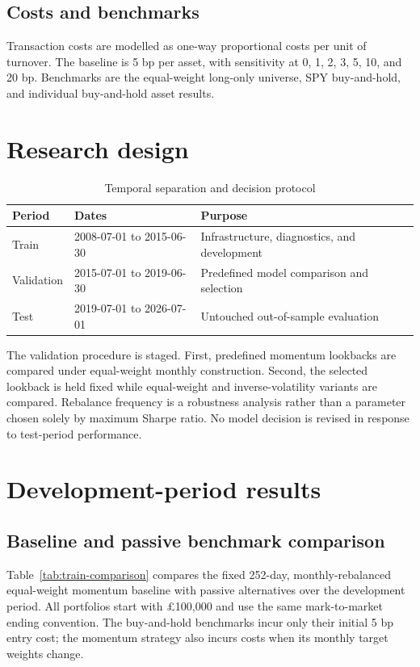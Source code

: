 \documentclass[11pt,a4paper]{article}
\begin{document}
\subsection{Costs and benchmarks}
Transaction costs are modelled as one-way proportional costs per unit of turnover. The baseline is 5 bp per asset, with sensitivity at 0, 1, 2, 3, 5, 10, and 20 bp. Benchmarks are the equal-weight long-only universe, SPY buy-and-hold, and individual buy-and-hold asset results.

\section{Research design}
\begin{table}[htbp]
\centering
\caption{Temporal separation and decision protocol}
\label{tab:splits}
\begin{tabular}{@{}lll@{}}
\toprule
\textbf{Period} & \textbf{Dates} & \textbf{Purpose} \\
\midrule
Train & 2008-07-01 to 2015-06-30 & Infrastructure, diagnostics, and development \\
Validation & 2015-07-01 to 2019-06-30 & Predefined model comparison and selection \\
Test & 2019-07-01 to 2026-07-01 & Untouched out-of-sample evaluation \\
\bottomrule
\end{tabular}
\end{table}

The validation procedure is staged. First, predefined momentum lookbacks are compared under equal-weight monthly construction. Second, the selected lookback is held fixed while equal-weight and inverse-volatility variants are compared. Rebalance frequency is a robustness analysis rather than a parameter chosen solely by maximum Sharpe ratio. No model decision is revised in response to test-period performance.

\section{Development-period results}

\subsection{Baseline and passive benchmark comparison}
Table~\ref{tab:train-comparison} compares the fixed 252-day, monthly-rebalanced equal-weight momentum baseline with passive alternatives over the development period. All portfolios start with \pounds100,000 and use the same mark-to-market ending convention. The buy-and-hold benchmarks incur only their initial 5 bp entry cost; the momentum strategy also incurs costs when its monthly target weights change.
\end{document}
